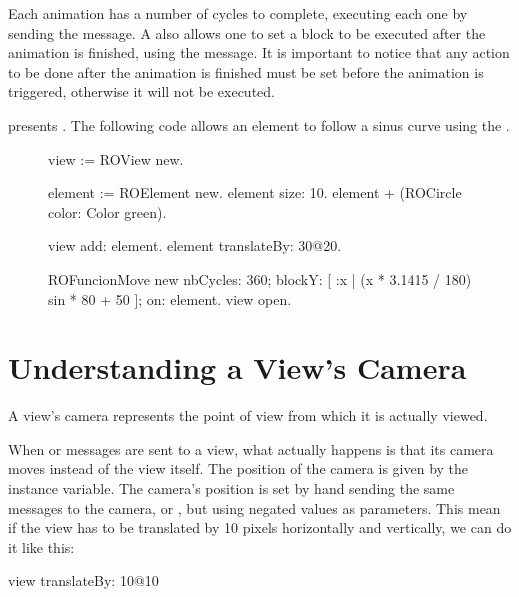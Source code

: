 \documentclass[a4paper,10pt,twoside]{book}
\begin{document}
Each animation has a number of cycles to complete, executing each one by sending the  message.
A  also allows one to set a block to be executed after the animation is finished, using the  message. It is important to notice that any action to be done after the animation is finished must be set before the animation is triggered, otherwise it will not be executed. %

 presents . The following code allows an element to follow a sinus curve using the .

\begin{figure}[H]
\begin{code}{}
view := ROView new.

element := ROElement new.
element size: 10.
element + (ROCircle color: Color green).

view add: element.
element translateBy: 30@20.

ROFuncionMove new
	nbCycles: 360;
	blockY: [ :x | (x * 3.1415 / 180) sin * 80 + 50 ];
	on: element.
view open.
\end{code}
\label{fig:animationCode}
\end{figure}




\section{Understanding a View's Camera} 

A view's camera represents the point of view from which it is actually viewed. 

When  or  messages are sent to a view, what actually happens is that its camera moves instead of the view itself. The position of the camera is given by the  instance variable. The camera's position is set by hand sending the same messages to the camera,  or , but using negated values as parameters. This mean if the view has to be translated by 10 pixels horizontally and vertically, we can do it like this:

\begin{code}{}
view translateBy: 10@10
\end{code}
\end{document}
